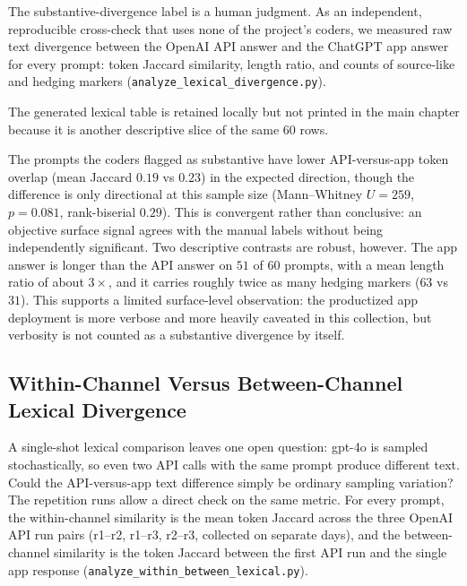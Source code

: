 The substantive-divergence label is a human judgment. As an independent,
reproducible cross-check that uses none of the project's coders, we measured raw
text divergence between the OpenAI API answer and the ChatGPT app answer for every
prompt: token Jaccard similarity, length ratio, and counts of source-like and
hedging markers (\texttt{analyze\_lexical\_divergence.py}).

The generated lexical table is retained locally but not printed in the main
chapter because it is another descriptive slice of the same 60 rows.

The prompts the coders flagged as substantive have lower API-versus-app token
overlap (mean Jaccard $0.19$ vs $0.23$) in the expected direction, though the
difference is only directional at this sample size (Mann--Whitney $U=259$,
$p=0.081$, rank-biserial $0.29$). This is convergent rather than conclusive: an
objective surface signal agrees with the manual labels without being independently
significant. Two descriptive contrasts are robust, however. The app answer is
longer than the API answer on $51$ of $60$ prompts, with a mean length ratio of
about $3\times$, and it carries roughly twice as many hedging markers
($63$ vs $31$). This supports a limited surface-level observation: the productized
app deployment is more verbose and more heavily caveated in this collection, but
verbosity is not counted as a substantive divergence by itself.

\subsection{Within-Channel Versus Between-Channel Lexical Divergence}

A single-shot lexical comparison leaves one open question: gpt-4o is sampled
stochastically, so even two API calls with the same prompt produce different
text. Could the API-versus-app text difference simply be ordinary sampling
variation? The repetition runs allow a direct check on the same metric. For
every prompt, the within-channel similarity is the mean token Jaccard across
the three OpenAI API run pairs (r1--r2, r1--r3, r2--r3, collected on separate
days), and the between-channel similarity is the token Jaccard between the
first API run and the single app response
(\texttt{analyze\_within\_between\_lexical.py}).


